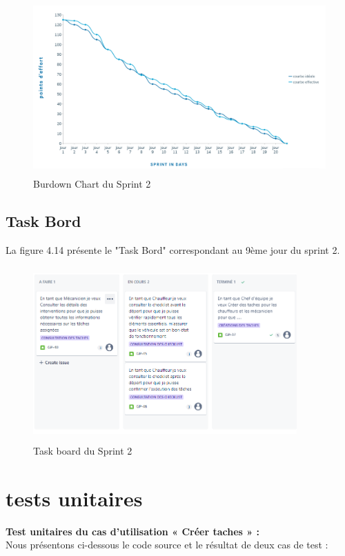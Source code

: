 \begin{figure}[h!]
  \centering
  \includegraphics[width=1\textwidth, height=6.7cm]{chap4.images/Burndown chart sprint 2.png}
  \caption{ Burdown Chart du Sprint 2}

\end{figure}
\subsection{Task Bord}

La figure 4.14 présente le "Task Bord" correspondant au 9ème jour du sprint 2.

\begin{figure}[h!]
  \centering
  \includegraphics[width=0.9\textwidth, height=6.7cm]{chap4.images/task board sprint 2.png}
  \caption{ Task board du Sprint 2 }

\end{figure}

\newpage
\section{tests unitaires}
\textbf{Test unitaires du cas d’utilisation « Créer taches  » :}\\
\bigskip
Nous présentons ci-dessous le code source et le résultat de deux cas de test :
\bigskip


